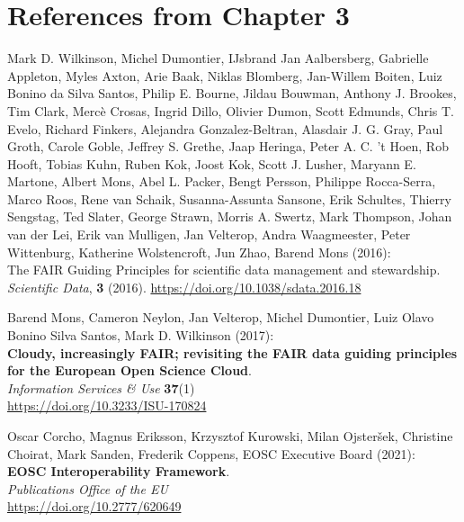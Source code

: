 
\section{References from Chapter 3}

\begin{thebibliography}{9}
   
Mark D. Wilkinson, Michel Dumontier, IJsbrand Jan Aalbersberg, Gabrielle
Appleton, Myles Axton, Arie Baak, Niklas Blomberg, Jan-Willem Boiten,
Luiz Bonino da Silva Santos, Philip E. Bourne, Jildau Bouwman, Anthony
J. Brookes, Tim Clark, Mercè Crosas, Ingrid Dillo, Olivier Dumon, Scott
Edmunds, Chris T. Evelo, Richard Finkers, Alejandra Gonzalez-Beltran,
Alasdair J. G. Gray, Paul Groth, Carole Goble, Jeffrey S. Grethe, Jaap
Heringa, Peter A. C. 't Hoen, Rob Hooft, Tobias Kuhn, Ruben Kok, Joost
Kok, Scott J. Lusher, Maryann E. Martone, Albert Mons, Abel L. Packer,
Bengt Persson, Philippe Rocca-Serra, Marco Roos, Rene van Schaik,
Susanna-Assunta Sansone, Erik Schultes, Thierry Sengstag, Ted Slater,
George Strawn, Morris A. Swertz, Mark Thompson, Johan van der Lei, Erik
van Mulligen, Jan Velterop, Andra Waagmeester, Peter Wittenburg,
Katherine Wolstencroft, Jun Zhao, Barend Mons (2016):\\The {FAIR
Guiding Principles} for scientific data management and stewardship.
\emph{Scientific Data}, \textbf{3} (2016).
\url{https://doi.org/10.1038/sdata.2016.18}

Barend Mons, Cameron Neylon, Jan Velterop, Michel Dumontier, Luiz Olavo
Bonino Silva Santos, Mark D. Wilkinson (2017): \\
\textbf{Cloudy, increasingly {FAIR}; revisiting the {FAIR} data guiding principles for the European
Open Science Cloud}.\\
\emph{Information Services \& Use} \textbf{37}(1)\\
\url{https://doi.org/10.3233/ISU-170824}

Oscar Corcho, Magnus Eriksson, Krzysztof Kurowski, Milan Ojsteršek,
Christine Choirat, Mark Sanden, Frederik Coppens, EOSC Executive
Board (2021): \\
\textbf{EOSC Interoperability Framework}.\\
\emph{Publications Office of the EU} \\
\url{https://doi.org/10.2777/620649}


\end{thebibliography}
